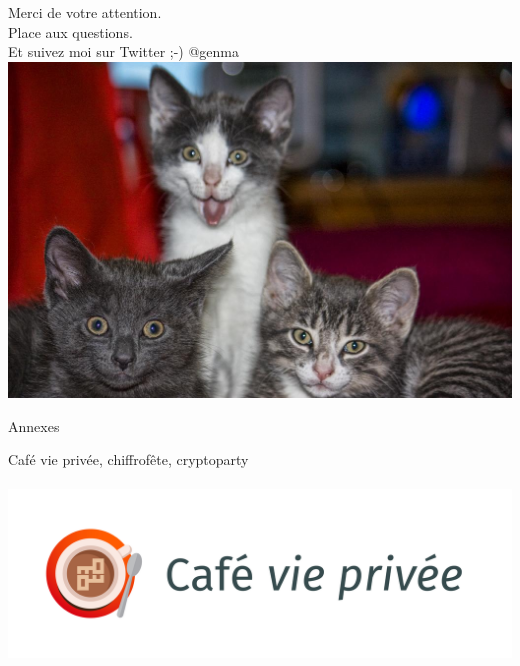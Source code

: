 \documentclass{beamer}
\begin{document}
\begin{frame}
\begin{center}
\Huge{Merci de votre attention. \\Place aux questions.
\\Et suivez moi sur Twitter ;-) @genma\\
\includegraphics[scale=0.2] {./images/chat.jpg}
}\end{center}
\end{frame}

\begin{frame}
\begin{center}
\Huge{Annexes }
\end{center}
\end{frame}

\begin{frame}
\begin{center}
\Huge{Café vie privée, chiffrofête, cryptoparty}
\\~\\
\includegraphics[scale=0.3] {./images/LogoCafeViePrivee.jpg}
\end{center}
\end{frame}
\end{document}
